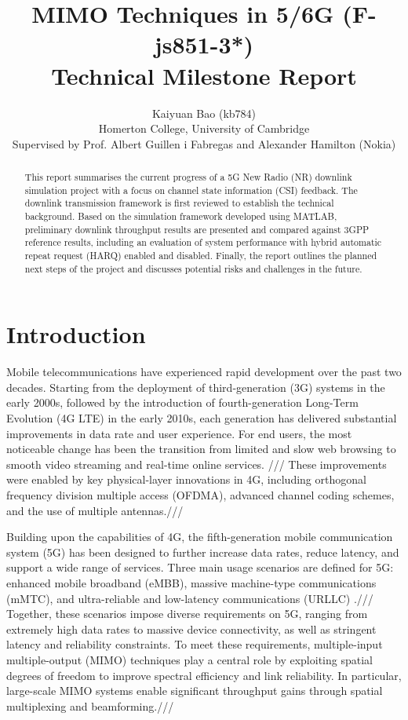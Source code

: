 \documentclass[a4paper,12pt,onecolumn]{article}
\title{\LARGE \bf
	MIMO Techniques in 5/6G (F-js851-3*) \\
	Technical Milestone Report}
\author{
	Kaiyuan Bao (kb784)\\
	Homerton College, University of Cambridge\\[6pt]
	\small Supervised by Prof. Albert Guillen i Fabregas and Alexander Hamilton (Nokia)
}
\begin{document}
	\maketitle
	\vspace{-35pt}
	\begin{abstract}
	This report summarises the current progress of a 5G New Radio (NR) downlink simulation project with a focus on channel state information (CSI) feedback. The downlink transmission framework is first reviewed to establish the technical background. Based on the simulation framework developed using MATLAB, preliminary downlink throughput results are presented and compared against 3GPP reference results, including an evaluation of system performance with hybrid automatic repeat request (HARQ) enabled and disabled. Finally, the report outlines the planned next steps of the project and discusses potential risks and challenges in the future.



	\end{abstract}
	\pagestyle{plain}
	
	\vspace{-0.8cm}
	
\section{Introduction}

Mobile telecommunications have experienced rapid development over the past two decades. Starting from the deployment of third-generation (3G) systems in the early 2000s, followed by the introduction of fourth-generation Long-Term Evolution (4G LTE) in the early 2010s, each generation has delivered substantial improvements in data rate and user experience. For end users, the most noticeable change has been the transition from limited and slow web browsing to smooth video streaming and real-time online services. /// These improvements were enabled by key physical-layer innovations in 4G, including orthogonal frequency division multiple access (OFDMA), advanced channel coding schemes, and the use of multiple antennas.///

Building upon the capabilities of 4G, the fifth-generation mobile communication system (5G) has been designed to further increase data rates, reduce latency, and support a wide range of services. Three main usage scenarios are defined for 5G: enhanced mobile broadband (eMBB), massive machine-type communications (mMTC), and ultra-reliable and low-latency communications (URLLC) \cite{EricssonBook}./// Together, these scenarios impose diverse requirements on 5G, ranging from extremely high data rates to massive device connectivity, as well as stringent latency and reliability constraints. To meet these requirements, multiple-input multiple-output (MIMO) techniques play a central role by exploiting spatial degrees of freedom to improve spectral efficiency and link reliability. In particular, large-scale MIMO systems enable significant throughput gains through spatial multiplexing and beamforming.///
\end{document}
